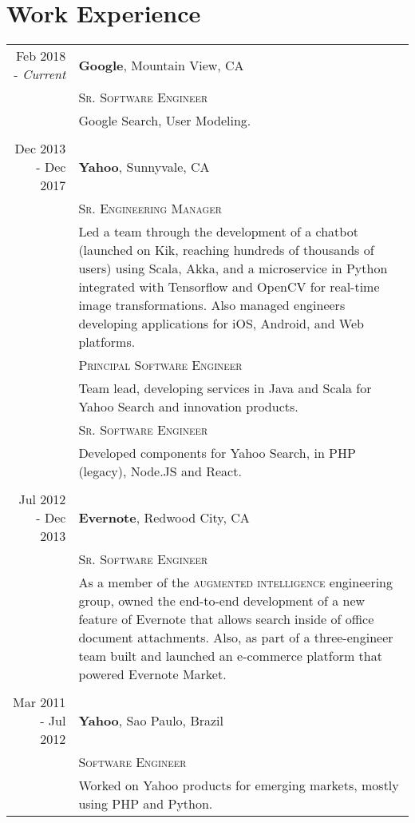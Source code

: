 \documentclass[a4paper,10pt]{article}
\begin{document}
\section{Work Experience}
\begin{tabular}{r|p{14cm}}
Feb 2018 - \emph{Current} & \textbf{Google}\footnotemark,
                                Mountain View, CA
\\ &\textsc{Sr. Software Engineer}\\&

Google Search, User Modeling.

 \\

 \multicolumn{2}{c}{} \\

Dec 2013 - Dec 2017 & \textbf{Yahoo}\footnotemark,
                                Sunnyvale, CA
\\ &\textsc{Sr. Engineering Manager}\\&

 Led a team through the development of a chatbot (launched on Kik, reaching
 hundreds of thousands of users) using Scala, Akka, and a microservice in Python
 integrated with Tensorflow and OpenCV for real-time image transformations.
 Also managed engineers developing applications for iOS, Android, and Web
 platforms.

 \\
 &\textsc{Principal Software Engineer}\\&

 Team lead, developing services in Java and Scala for Yahoo Search
 and innovation products.

 \\
 &\textsc{Sr. Software Engineer}\\&

 Developed components for Yahoo Search, in PHP (legacy), Node.JS and React.

 \\

 \multicolumn{2}{c}{} \\

 Jul 2012 - Dec 2013 & \textbf{Evernote}, Redwood City, CA \\
 &\textsc{Sr. Software Engineer}\\&

 As a member of the \textsc{augmented intelligence} engineering group, owned
 the end-to-end development of a new feature of Evernote that allows search
 inside of office document attachments. Also, as part of a three-engineer team
 built and launched an e-commerce platform that powered Evernote Market.

 \\
 \multicolumn{2}{c}{} \\

 Mar 2011 - Jul 2012 & \textbf{Yahoo}\footnotemark[1], Sao Paulo, Brazil \\
 &\textsc{Software Engineer}\\&

 Worked on Yahoo products for emerging markets, mostly using PHP and Python.

\end{tabular}
\end{document}
